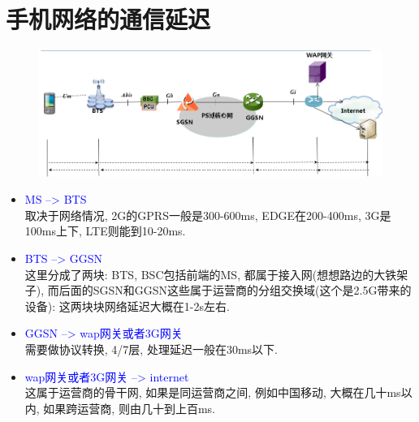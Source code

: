 \section {\ZHH 手机网络的通信延迟} {
    \begin {figure} [htbp]
        \centering
        \includegraphics [width = 400pt, keepaspectratio] {mobile_to_internet.png}
    \end {figure}

    \begin {itemize}

        \item {\textcolor {blue} {MS --> BTS} }\\
        { 取决于网络情况, 2G的GPRS一般是300-600ms, EDGE在200-400ms, 3G是100ms上下, LTE则能到10-20ms. } \\

        \item {\textcolor {blue} {BTS --> GGSN} } \\
        { 这里分成了两块: BTS, BSC包括前端的MS, 都属于接入网(想想路边的大铁架子), 而后面的SGSN和GGSN这些属于运营商的分组交换域(这个是2.5G带来的设备): 这两块块网络延迟大概在1-2s左右. } \\

        \item {\textcolor {blue} {GGSN --> wap网关或者3G网关} } \\
        { 需要做协议转换, 4/7层, 处理延迟一般在30ms以下. } \\

        \item {\textcolor {blue} {wap网关或者3G网关 --> internet} } \\
        { 这属于运营商的骨干网, 如果是同运营商之间, 例如中国移动, 大概在几十ms以内, 如果跨运营商, 则由几十到上百ms. } \\

    \end {itemize}
}

